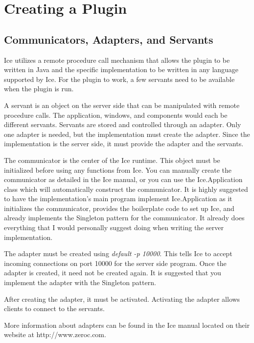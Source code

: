 
\section{Creating a Plugin}

\subsection{Communicators, Adapters, and Servants}

Ice utilizes a remote procedure call mechanism that allows the plugin to be written in Java and the specific implementation to be written in any language supported by Ice. For the plugin to work, a few servants need to be available when the plugin is run.

A servant is an object on the server side that can be manipulated with remote procedure calls. The application, windows, and components would each be different servants. Servants are stored and controlled through an adapter. Only one adapter is needed, but the implementation must create the adapter. Since the implementation is the server side, it must provide the adapter and the servants.

The communicator is the center of the Ice runtime. This object must be initialized before using any functions from Ice. You can manually create the communicator as detailed in the Ice manual, or you can use the Ice.Application class which will automatically construct the communicator. It is highly suggested to have the implementation's main program implement Ice.Application as it initializes the communicator, provides the boilerplate code to set up Ice, and already implements the Singleton pattern for the communicator. It already does everything that I would personally suggest doing when writing the server implementation.

The adapter must be created using \emph{default -p 10000}. This tells Ice to accept incoming connections on port 10000 for the server side program. Once the adapter is created, it need not be created again. It is suggested that you implement the adapter with the Singleton pattern.

After creating the adapter, it must be activated. Activating the adapter allows clients to connect to the servants.

More information about adapters can be found in the Ice manual located on their website at http://www.zeroc.com.

